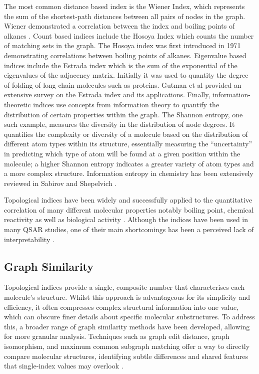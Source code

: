 \documentclass[
  super,
  preprint,
  3p]{elsarticle}
\begin{document}
The most common distance based index is the Wiener Index, which
represents the sum of the shortest-path distances between all pairs of
nodes in the graph. Wiener demonstrated a correlation between the index
and boiling points of alkanes \citep{wiener_1947}. Count based indices
include the Hosoya Index which counts the number of matching sets in the
graph. The Hosoya index was first introduced in 1971 \citep{Hosoya_1971}
demonstrating correlations between boiling points of alkanes. Eigenvalue
based indices include the Estrada index which is the sum of the
exponential of the eigenvalues of the adjacency matrix. Initially it was
used to quantity the degree of folding of long chain molecules such as
proteins. Gutman et al \citep{IvanGutman2011} provided an extensive
survey on the Estrada index and its applications. Finally,
information-theoretic indices use concepts from information theory to
quantify the distribution of certain properties within the graph. The
Shannon entropy, one such example, measures the diversity in the
distribution of node degrees. It quantifies the complexity or diversity
of a molecule based on the distribution of different atom types within
its structure, essentially measuring the ``uncertainty'' in predicting
which type of atom will be found at a given position within the
molecule; a higher Shannon entropy indicates a greater variety of atom
types and a more complex structure. Information entropy in chemistry has
been extensively reviewed in Sabirov and Shepelvich
\citep{sabirov_information_2021}.

Topological indices have been widely and successfully applied to the
quantitative correlation of many different molecular properties notably
boiling point, chemical reactivity as well as biological activity
\citep{roy_use_2017, ramakrishnan_topological_2013}. Although the
indices have been used in many QSAR studies, one of their main
shortcomings has been a perceived lack of interpretability
\citep{todeschini_chemical_1992}.

\subsection{Graph Similarity}\label{graph-similarity}

Topological indices provide a single, composite number that
characterises each molecule's structure. Whilst this approach is
advantageous for its simplicity and efficiency, it often compresses
complex structural information into one value, which can obscure finer
details about specific molecular substructures. To address this, a
broader range of graph similarity methods have been developed, allowing
for more granular analysis. Techniques such as graph edit distance,
graph isomorphism, and maximum common subgraph matching offer a way to
directly compare molecular structures, identifying subtle differences
and shared features that single-index values may overlook
\citep{ullmann_algorithm_1976, pelillo_replicator_1999, melnik_similarity_2002, jeh_simrank_2002, zager_graph_2008, koutra_algorithms_2011, chartrand_graph_1998}.
\end{document}
